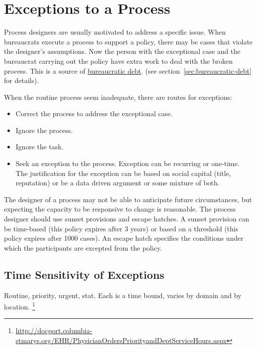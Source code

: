 \section{Exceptions to a Process\label{sec:exceptions-to-process}}


Process designers are usually motivated to address a specific issue. When bureaucrats execute a process to support a policy, there may be cases that violate the designer's assumptions. Now the person with the exceptional case and the bureaucrat carrying out the policy have extra work to deal with the broken process. This is a source of \hyperref[sec:bureaucratic-debt]{bureaucratic debt}. 
\ifsectionref
(see section~\ref{sec:bureaucratic-debt} for details). 
\fi

When the routine process seem inadequate, there are routes for exceptions:
\begin{itemize}
    \item Correct the process to address the exceptional case.
    \item Ignore the process.
    \item Ignore the task.
    \item Seek an exception to the process. Exception can be recurring or one-time. The justification for the exception can be based on social capital (title, reputation) or be a data driven argument or some mixture of both.
\end{itemize}

The designer of a process may not be able to anticipate future circumstances, but expecting the capacity to be responsive to change is reasonable. The process designer should use sunset provisions and escape hatches.  
A sunset provision can be time-based (this policy expires after 3 years) or based on a threshold (this policy expires after 1000 cases). An escape hatch specifies the conditions under which the participants are excepted from the policy. 

\subsection*{Time Sensitivity of Exceptions}
Routine, priority, urgent, stat. 
Each is a time bound, varies by domain and by location.
\footnote{\href{http://docport.columbia-stmarys.org/EHR/PhysicianOrdersPriorityandDeptServiceHours.aspx}{http://docport.columbia-stmarys.org/EHR/PhysicianOrdersPriorityandDeptServiceHours.aspx}}
